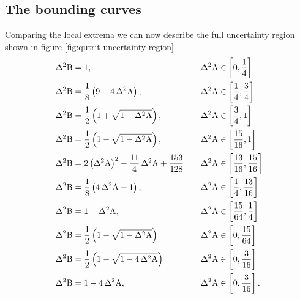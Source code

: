 \begin{subappendices}
\subsection{The bounding curves}
Comparing the local extrema we can now describe the full uncertainty region shown in figure \ref{fig:qutrit-uncertainty-region}
\begin{alignat}{2}
  & \var{\opb} = 1, \quad && \var{\opa}\in\left[0,\frac{1}{4}\right]\\
  & \var{\opb} = \frac{1}{8} \left(9-4\,\var{\opa}\right), \quad && \var{\opa}\in\left[\frac{1}{4},\frac{3}{4}\right]\\
  & \var{\opb} = \frac{1}{2} \left(1+\sqrt{1-\var{\opa}}\right), \quad && \var{\opa}\in\left[\frac{3}{4}, 1\right]\\
  & \var{\opb} = \frac{1}{2} \left(1-\sqrt{1-\var{\opa}}\right), \quad && \var{\opa}\in\left[\frac{15}{16}, 1\right]\\ 
  & \var{\opb} =  2 \left(\var{\opa}\right)^2-\frac{11}{4}\,\var{\opa}+\frac{153}{128} \quad && \var{\opa}\in\left[\frac{13}{16},\frac{15}{16}\right]\\
  & \var{\opb} = \frac{1}{8} \left(4\,\var{\opa}-1\right), \quad && \var{\opa}\in\left[\frac{1}{4}, \frac{13}{16}\right]\\
  & \var{\opb} = 1-\var{\opa}, \quad && \var{\opa}\in\left[\frac{15}{64},\frac{1}{4}\right]\\
  & \var{\opb} = \frac{1}{2}\left(1-\sqrt{1-\var{\opa}}\right) \quad && \var{\opa}\in\left[0,\frac{15}{64}\right]\\
  & \var{\opb} = \frac{1}{2} \left(1-\sqrt{1-4\,\var{\opa}}\right)\quad  && \var{\opa}\in\left[0,\frac{3}{16}\right]\\  
  & \var{\opb} = 1-4\,\var{\opa}, \quad && \var{\opa}\in\left[0,\frac{3}{16}\right].
  \label{eqn:gellmann-bounding-curves}
\end{alignat}

\end{subappendices}

